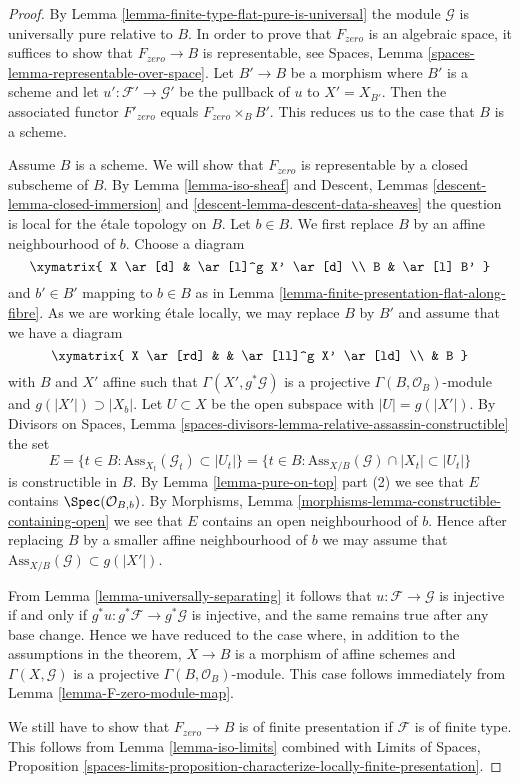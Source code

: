 \begin{proof}
By Lemma \ref{lemma-finite-type-flat-pure-is-universal}
the module $\mathcal{G}$ is universally pure relative to $B$.
In order to prove that $F_{zero}$ is an algebraic space,
it suffices to show that $F_{zero} \to B$ is representable, see
Spaces, Lemma \ref{spaces-lemma-representable-over-space}.
Let $B' \to B$ be a morphism where $B'$ is a scheme and let
$u' : \mathcal{F}' \to \mathcal{G}'$ be the pullback of $u$ to $X' = X_{B'}$.
Then the associated functor $F'_{zero}$ equals $F_{zero} \times_B B'$.
This reduces us to the case that $B$ is a scheme.

\medskip\noindent
Assume $B$ is a scheme. We will show that $F_{zero}$ is representable
by a closed subscheme of $B$. By Lemma \ref{lemma-iso-sheaf} and
Descent, Lemmas \ref{descent-lemma-closed-immersion} and
\ref{descent-lemma-descent-data-sheaves}
the question is local for the \'etale topology on $B$. Let $b \in B$.
We first replace $B$ by an affine neighbourhood of $b$.
Choose a diagram
$$
\xymatrix{
X \ar[d] & \ar[l]^g X' \ar[d] \\
B & \ar[l] B'
}
$$
and $b' \in B'$ mapping to $b \in B$
as in Lemma \ref{lemma-finite-presentation-flat-along-fibre}.
As we are working \'etale locally, we may replace
$B$ by $B'$ and assume that we have a diagram
$$
\xymatrix{
X \ar[rd] & & \ar[ll]^g X' \ar[ld] \\
& B
}
$$
with $B$ and $X'$ affine such that $\Gamma(X', g^*\mathcal{G})$
is a projective $\Gamma(B, \mathcal{O}_B)$-module and
$g(|X'|) \supset |X_b|$. Let $U \subset X$ be the open subspace
with $|U| = g(|X'|)$. By
Divisors on Spaces, Lemma
\ref{spaces-divisors-lemma-relative-assassin-constructible} the set
$$
E = \{t \in B : \text{Ass}_{X_t}(\mathcal{G}_t) \subset |U_t|\} =
\{t \in B : \text{Ass}_{X/B}(\mathcal{G}) \cap |X_t| \subset |U_t|\}
$$
is constructible in $B$. By Lemma \ref{lemma-pure-on-top} part (2)
we see that $E$ contains $\Spec(\mathcal{O}_{B, b})$. By
Morphisms, Lemma \ref{morphisms-lemma-constructible-containing-open}
we see that $E$ contains an open neighbourhood of $b$. Hence after
replacing $B$ by a smaller affine neighbourhood of $b$ we may assume that
$\text{Ass}_{X/B}(\mathcal{G}) \subset g(|X'|)$.

\medskip\noindent
From Lemma \ref{lemma-universally-separating}
it follows that $u : \mathcal{F} \to \mathcal{G}$ is injective if and only if
$g^*u : g^*\mathcal{F} \to g^*\mathcal{G}$ is injective, and the same remains
true after any base change. Hence we have reduced to the case where,
in addition to the assumptions in the theorem, $X \to B$ is a morphism of
affine schemes and $\Gamma(X, \mathcal{G})$ is a projective
$\Gamma(B, \mathcal{O}_B)$-module. This case follows immediately from
Lemma \ref{lemma-F-zero-module-map}.

\medskip\noindent
We still have to show that $F_{zero} \to B$ is of finite presentation if
$\mathcal{F}$ is of finite type. This follows from
Lemma \ref{lemma-iso-limits} combined with
Limits of Spaces, Proposition
\ref{spaces-limits-proposition-characterize-locally-finite-presentation}.
\end{proof}

